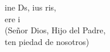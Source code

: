 \begin{cancion}%
	ine Ds, ius ris,\\
	ere i\\
(Señor Dios, Hijo del Padre,\\
 ten piedad de nosotros)\\
\end{cancion}%
